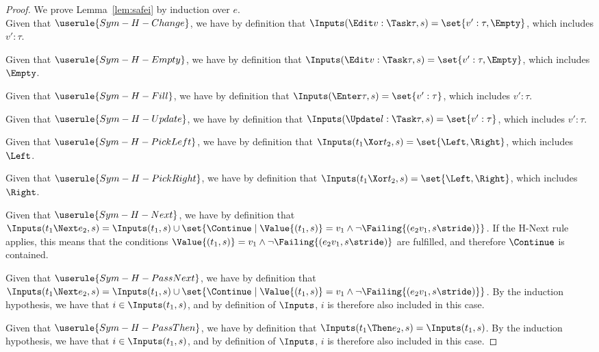 \begin{proof}
  We prove Lemma~\ref{lem:safei} by induction over $e$.\\

       {Given that $\userule{Sym-H-Change}$, we have by definition that $\Inputs(\Edit v:\Task\tau,s) = \set{v':\tau,\Empty}$, which includes $v':\tau$.}

       {Given that $\userule{Sym-H-Empty}$, we have by definition that $\Inputs(\Edit v:\Task\tau,s) = \set{v':\tau,\Empty}$, which includes $\Empty$.}

       {Given that $\userule{Sym-H-Fill}$, we have by definition that $\Inputs(\Enter \tau,s) = \set{v':\tau }$, which includes $v':\tau$.}

       {Given that $\userule{Sym-H-Update}$, we have by definition that $\Inputs(\Update l:\Task\tau,s)= \set{v':\tau }$, which includes $v':\tau$.}

       {Given that $\userule{Sym-H-PickLeft}$, we have by definition that $\Inputs(t_1\Xor t_2,s) = \set{ \Left,\Right}$, which includes $\Left$.}

       {Given that $\userule{Sym-H-PickRight}$, we have by definition that $\Inputs(t_1\Xor t_2,s) = \set{ \Left,\Right}$, which includes $\Right$.}

       {Given that $\userule{Sym-H-Next}$, we have by definition that $\Inputs(t_1\Next e_2,s) = \Inputs(t_1,s) \cup \set{\Continue\mid \Value{(t_1,s)} = v_1 \wedge \neg\Failing{(e_2 v_1,s\stride)}}$.
       If the H-Next rule applies, this means that the conditions $\Value{(t_1,s)} = v_1 \wedge \neg\Failing{(e_2 v_1,s\stride)}$ are fulfilled, and therefore $\Continue$ is contained.}

       {Given that $\userule{Sym-H-PassNext}$, we have by definition that $\Inputs(t_1\Next e_2,s) = \Inputs(t_1,s) \cup \set{\Continue\mid \Value{(t_1,s)} = v_1 \wedge \neg\Failing{(e_2 v_1,s\stride)}}$.
       By the induction hypothesis, we have that $i\in \Inputs(t_1,s)$, and by definition of $\Inputs$, $i$ is therefore also included in this case.}

       {Given that $\userule{Sym-H-PassThen}$, we have by definition that $\Inputs(t_1\Then e_2,s)= \Inputs(t_1,s)$.
       By the induction hypothesis, we have that $i\in \Inputs(t_1,s)$, and by definition of $\Inputs$, $i$ is therefore also included in this case.}


\end{proof}
